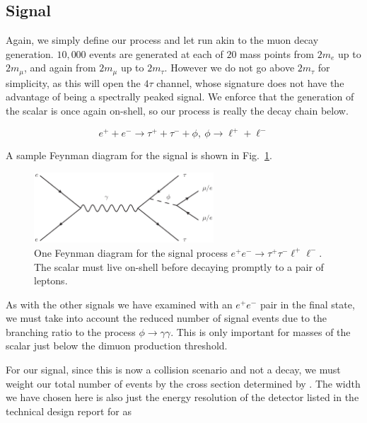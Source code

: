 \subsection{Signal}
Again, we simply define our process and let \madgraph run akin to the muon decay generation.
$10,000$ events are generated at each of $20$ mass points from $2m_e$ up to $2m_\mu$, and again from $2m_\mu$ up to $2m_\tau$.
However we do not go above $2m_\tau$ for simplicity, as this will open the $4\tau$ channel, whose signature does not have the advantage of being a spectrally peaked signal. 
We enforce that the generation of the scalar is once again on-shell, so our process is really the decay chain below.

\begin{equation}
    e^+ + e^- \rightarrow \tau^+ + \tau^- + \phi,~\phi \rightarrow \ell^+ + \ell^-
\end{equation}

A sample Feynman diagram for the signal is shown in Fig.\ \ref{fig:ee_tautaull_scalar}.

\begin{figure}[h]
    \centering
    \includegraphics[width=0.6\textwidth]{Figures/feynman_diagrams/ee_tautaull_scalar}
    \caption{One Feynman diagram for the signal process $e^+ e^- \rightarrow \tau^+ \tau^- \ell^+ \ell^-$. The scalar must live on-shell before decaying promptly to a pair of leptons.}
    \label{fig:ee_tautaull_scalar}
\end{figure}

As with the other signals we have examined with an $e^+ e^-$ pair in the final state, we must take into account the reduced number of signal events due to the branching ratio to the process $\phi \rightarrow \gamma \gamma$.
This is only important for masses of the scalar just below the dimuon production threshold.

For our signal, since this is now a collision scenario and not a decay, we must weight our total number of events by the cross section determined by \madgraph.
The width we have chosen here is also just the energy resolution of the detector listed in the technical design report for \belletwo \cite{Abe:2010gxa} as

